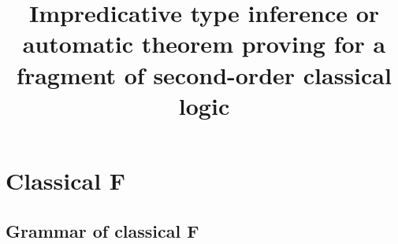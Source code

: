 \documentclass{amsart}
\title
[Impredicative type inference]
{
Impredicative type inference
\break
or
\break
automatic theorem proving \break
for a fragment of \break
second-order classical logic
}
\begin{document}
\newcommand{\nc}{\newcommand}
\newcommand{\DotExpr}[2]{#1 #2.\ }
\nc\Abs   {\DotExpr\lambda}
\nc\All   {\DotExpr\forall}
\nc\CallCC{\operatorname{call/cc}}
\nc\Cps   {\operatorname{cps}}
\nc\Dn [1]{(#1 \R \bot) \R \bot}
\nc\Ex    {\DotExpr\exists}
\nc\FV    {\operatorname{FV}}
\nc\Mgs   {\operatorname{mgs}}
\nc\Or    {\ | \ }
\nc\Prune {\operatorname{prune}}
\nc\Recall{\DotExpr\Xi} %
\nc\Redo  {\operatorname{redo}}
\nc\Tabs  {\DotExpr\Lambda}
\nc\R     {\rightarrow}
\nc\Undo  {\operatorname{undo}}
\nc\Unify {\operatorname{unify}}

\maketitle
\tableofcontents

\section{Classical F}

\subsection{Grammar of classical F}

\nc\Ftype{
\tau & ::= & \alpha & \mbox{type variable} \\
&\Or& \tau \rightarrow \tau & \mbox{function type} \\
&\Or& \All\alpha\tau & \mbox{universal type} \\
}

\nc\CFtype{
\Ftype
&\Or& \Ex\alpha\tau & \mbox{existential type} \\
}

\nc\CFterm{
t & ::= & x & \mbox{variables} \\
&\Or& \Abs{x:\tau}t  & \mbox{lambda abstraction} \\
&\Or& \ t~t & \mbox{function application} \\
}

\nc\SelectiveTypeAmnesia{
&\Or& t~\{\Ex\alpha\tau\} & \mbox{selective type amnesia} \\
}

\nc\TypingContexts{
\Gamma & ::= & \Gamma, x : \tau & \mbox{term variable binding}\\
&\Or& \Gamma, \alpha& \mbox{type variable binding} \\
&\Or& \epsilon & \mbox{empty context}\\ \\
}
\end{document}
